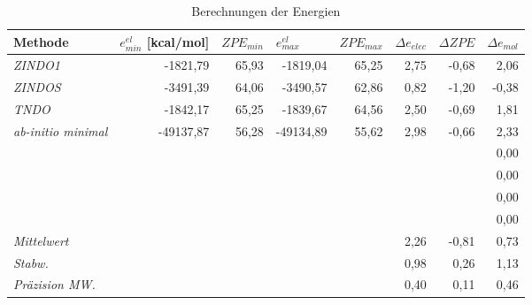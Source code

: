\begin{table}[H]
  \centering
  \caption{Berechnungen der Energien}
  \begin{tabular}{lrrrrrrr}
    \toprule
    \textbf{Methode} & \multicolumn{1}{l}{\boldmath{}\textbf{$e^{el}_{min}$ [kcal/mol]}\unboldmath{}} & \multicolumn{1}{l}{\boldmath{}\textbf{$ZPE_{min}$}\unboldmath{}} & \multicolumn{1}{l}{\boldmath{}\textbf{$e^{el}_{max}$}\unboldmath{}} & \multicolumn{1}{l}{\boldmath{}\textbf{$ZPE_{max}$}\unboldmath{}} & \multicolumn{1}{l}{\boldmath{}\textbf{$\Delta e_{elec}$}\unboldmath{}} & \multicolumn{1}{l}{\boldmath{}\textbf{$\Delta ZPE$}\unboldmath{}} & \multicolumn{1}{l}{\boldmath{}\textbf{$\Delta e_{mol}$}\unboldmath{}} \\
    \midrule
    \textit{ZINDO1} & -1821,79 & 65,93 & -1819,04 & 65,25 & 2,75  & -0,68 & 2,06 \\
    \textit{ZINDOS} & -3491,39 & 64,06 & -3490,57 & 62,86 & 0,82  & -1,20 & -0,38 \\
    \textit{TNDO} & -1842,17 & 65,25 & -1839,67 & 64,56 & 2,50  & -0,69 & 1,81 \\
    \textit{ab-initio minimal} & -49137,87 & 56,28 & -49134,89 & 55,62 & 2,98  & -0,66 & 2,33 \\
    \midrule
          &       &       &       &       &       &       & 0,00 \\
          &       &       &       &       &       &       & 0,00 \\
          &       &       &       &       &       &       & 0,00 \\
          &       &       &       &       &       &       & 0,00 \\
    \midrule
    \midrule
    \textit{Mittelwert} &       &       &       &       & 2,26  & -0,81 & 0,73 \\
    \textit{Stabw.} &       &       &       &       & 0,98  & 0,26  & 1,13 \\
    \textit{Präzision MW.} &       &       &       &       & 0,40  & 0,11  & 0,46 \\
    \bottomrule
    \end{tabular}%
  \label{tab:addlabel}%
\end{table}%

